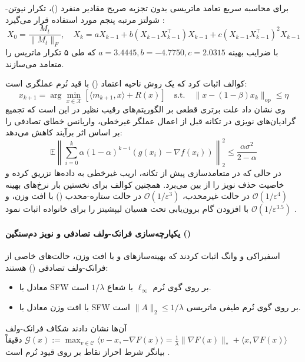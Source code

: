 برای محاسبه سریع تعامد ماتریسی بدون تجزیه صریح مقادیر منفرد ()، تکرار نیوتن-شولتز مرتبه پنجم مورد استفاده قرار می‌گیرد \cite{liu2025muon}:
\begin{equation}
    X_0 = \frac{M_t}{\|M_t\|_F}, \quad X_k = a X_{k-1} + b (X_{k-1}X_{k-1}^\top)X_{k-1} + c (X_{k-1}X_{k-1}^\top)^2 X_{k-1}
\end{equation}
با ضرایب بهینه $a = 3.4445, b = -4.7750, c = 2.0315$ که طی ۵ تکرار ماتریس را متعامد می‌سازند.

کوالف \cite{kovalev2025understanding} اثبات کرد که  یک روش ناحیه اعتماد () با قید نُرم عملگری است:
\begin{equation}
    x_{k+1} = \arg\min_{x \in \mathcal{X}} [\langle m_{k+1}, x \rangle + R(x)] \quad \text{s.t.} \quad \|x - (1-\beta)x_k\|_{\text{op}} \le \eta
\end{equation}
وی نشان داد علت برتری قطعی  بر الگوریتم‌های رقیب نظیر  \cite{tuddenham2022orthogonalising} در این است که تجمیع گرادیان‌های نویزی در تکانه قبل از اعمال عملگر غیرخطی، واریانس خطای تصادفی را بر اساس اثر برآیند کاهش می‌دهد:
\begin{equation}
    \mathbb{E}\left\|\sum_{i=0}^k \alpha(1-\alpha)^{k-i}(g(x_i) - \nabla f(x_i))\right\|_2^2 \le \frac{\alpha \sigma^2}{2-\alpha}
\end{equation}
در حالی که در  متعامدسازی پیش از تکانه، اریب غیرخطی به داده‌ها تزریق کرده و خاصیت حذف نویز را از بین می‌برد. همچنین کوالف برای نخستین بار نرخ‌های بهینه $\mathcal{O}(1/\varepsilon^4)$ در حالت غیرمحدب، $\mathcal{O}(1/\varepsilon^3)$ در حالت ستاره-محدب () با افت وزن، و $\mathcal{O}(1/\varepsilon^{3.5})$ با افزودن گام برون‌یابی تحت هسیان لیپشیتز را برای خانواده  اثبات نمود \cite{kovalev2025understanding}.

\paragraph*{یکپارچه‌سازی فرانک-ولف تصادفی و نویز دم‌سنگین ()}
اسفیراکی و وانگ \cite{sfyraki2026lions} اثبات کردند که بهینه‌سازهای  و  با افت وزن، حالت‌های خاصی از فرانک-ولف تصادفی () هستند:
\begin{itemize}
    \item {} معادل با SFW بر روی گوی نُرم $\ell_\infty$ با شعاع $1/\lambda$ است.
    \item {} با افت وزن معادل با SFW بر روی گوی نُرم طیفی ماتریسی $\|A\|_2 \le 1/\lambda$ است.
\end{itemize}
آن‌ها نشان دادند شکاف فرانک-ولف $\mathcal{G}(x) := \max_{v \in \mathcal{C}} \langle v - x, -\nabla F(x) \rangle = \frac{1}{\lambda}\|\nabla F(x)\|_* + \langle x, \nabla F(x) \rangle$ دقیقاً بیانگر شرط احراز نقاط  بر روی قیود نُرم است \cite{sfyraki2026lions}.

